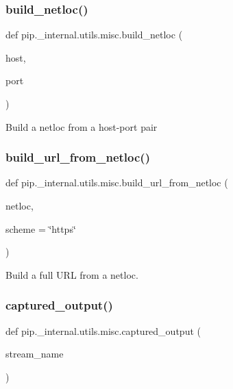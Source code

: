 \subsubsection{\texorpdfstring{build\+\_\+netloc()}{build\_netloc()}}
{\footnotesize\ttfamily def pip.\+\_\+internal.\+utils.\+misc.\+build\+\_\+netloc (\begin{DoxyParamCaption}\item[{}]{host,  }\item[{}]{port }\end{DoxyParamCaption})}

\begin{DoxyVerb}Build a netloc from a host-port pair
\end{DoxyVerb}
 \mbox{\label{namespacepip_1_1__internal_1_1utils_1_1misc_a26814f24347ef6f8f107760385e2b799}} 
\subsubsection{\texorpdfstring{build\+\_\+url\+\_\+from\+\_\+netloc()}{build\_url\_from\_netloc()}}
{\footnotesize\ttfamily def pip.\+\_\+internal.\+utils.\+misc.\+build\+\_\+url\+\_\+from\+\_\+netloc (\begin{DoxyParamCaption}\item[{}]{netloc,  }\item[{}]{scheme = {\ttfamily \char`\"{}https\char`\"{}} }\end{DoxyParamCaption})}

\begin{DoxyVerb}Build a full URL from a netloc.
\end{DoxyVerb}
 \mbox{\label{namespacepip_1_1__internal_1_1utils_1_1misc_a3411ad22fe24ddaccc0342d1f68eb0db}} 
\subsubsection{\texorpdfstring{captured\+\_\+output()}{captured\_output()}}
{\footnotesize\ttfamily def pip.\+\_\+internal.\+utils.\+misc.\+captured\+\_\+output (\begin{DoxyParamCaption}\item[{}]{stream\+\_\+name }\end{DoxyParamCaption})}

